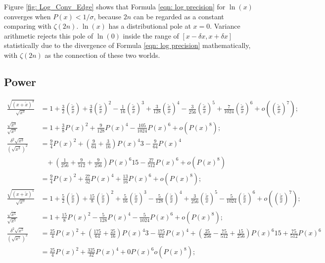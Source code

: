 \documentclass[twoside]{article}
\numberwithin{equation}{section}
\newcommand{\eqspace}{\;\;\;}
\begin{document}
Figure \ref{fig: Log_Conv_Edge} shows that Formula \eqref{eqn: log precision} for $\ln(x)$ converges when $P(x) < 1/\sigma$, because $2n$ can be regarded as a constant comparing with $\zeta(2n)$.
$\ln(x)$ has a distributional pole at $x = 0$.
Variance arithmetic rejects this pole of $\ln(0)$ inside the range of $[x - \delta x, x + \delta x]$ statistically due to the divergence of Formula \eqref{eqn: log precision} mathematically, with $\zeta(2n)$ as the connection of these two worlds.


\subsection{Power}

\iffalse

\begin{align*}
\frac{\sqrt{(x + \tilde{x})^3}}{\sqrt{x^3}} &= 1 + \frac{3}{2} (\frac{\tilde{x}}{x}) + \frac{3}{8} (\frac{\tilde{x}}{x})^2 - \frac{1}{16} (\frac{\tilde{x}}{x})^3 
		+ \frac{3}{128} (\frac{\tilde{x}}{x})^4 - \frac{3}{256} (\frac{\tilde{x}}{x})^5 + \frac{7}{1024} (\frac{\tilde{x}}{x})^6 + o((\frac{\tilde{x}}{x})^7); \\
\frac{\overline{\sqrt{x^3}}}{\sqrt{x^3}} &= 1 + \frac{3}{8} P(x)^2 + \frac{9}{128} P(x)^4 - \frac{105}{1024} P(x)^6  + o(P(x)^8); \\
\frac{\delta^2 \sqrt{x^3}}{(\sqrt{x^3})^2} &= \frac{9}{4} P(x)^2 + (\frac{9}{64} + \frac{3}{16}) P(x)^4 3 - \frac{9}{64} P(x)^4  \\
		&\eqspace + (\frac{1}{256} + \frac{9}{512} + \frac{9}{256}) P(x)^6 15 - \frac{27}{512} P(x)^6 + o(P(x)^8) \\
	&= \frac{9}{4} P(x)^2 + \frac{27}{32} P(x)^4 + \frac{13}{16} P(x)^6 + o(P(x)^8) ; \\
\frac{\sqrt{(x + \tilde{x})^5}}{\sqrt{x^5}} &= 1 + \frac{5}{2} (\frac{\tilde{x}}{x}) + \frac{15}{8} (\frac{\tilde{x}}{x})^2
		+ \frac{5}{16} (\frac{\tilde{x}}{x})^3 - \frac{5}{128} (\frac{\tilde{x}}{x})^4 
		+ \frac{3}{256} (\frac{\tilde{x}}{x})^5 - \frac{5}{1024} (\frac{\tilde{x}}{x})^6 + o((\frac{\tilde{x}}{x})^7); \\
\frac{\overline{\sqrt{x^5}}}{\sqrt{x^5}} &= 1 + \frac{15}{8} P(x)^2 - \frac{5}{128} P(x)^4 - \frac{5}{1024} P(x)^6  + o(P(x)^8); \\
\frac{\delta^2 \sqrt{x^5}}{(\sqrt{x^5})^2} &= \frac{25}{4} P(x)^2 + (\frac{175}{64} + \frac{25}{16}) P(x)^4 3 - \frac{175}{64} P(x)^4
		+ (\frac{25}{256} - \frac{75}{512} + \frac{15}{256}) P(x)^6 15 + \frac{75}{512} P(x)^6  \\
	&= \frac{25}{4} P(x)^2 + \frac{325}{32} P(x)^4 + 0 P(x)^6 o(P(x)^8)  ;
\end{align*}
\end{document}
